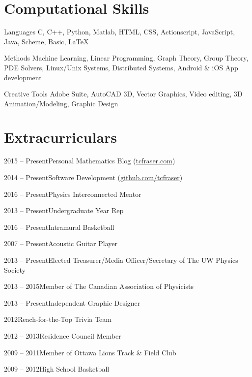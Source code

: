 \documentclass{article}
\begin{document}
    \section{Computational Skills}
    \begin{computerlist}
        \item{Languages}
             {C, C++, Python, Matlab, HTML, CSS, Actionscript, JavaScript, Java, Scheme, Basic, LaTeX}
        \item{Methods}
             {Machine Learning, Linear Programming, Graph Theory, Group Theory, PDE Solvers, Linux/Unix Systems, Distributed Systems, Android \& iOS App development}
        \item{Creative Tools}
             {Adobe Suite, AutoCAD 3D, Vector Graphics, Video editing, 3D Animation/Modeling, Graphic Design}
    \end{computerlist}
    \section{Extracurriculars}
    \begin{extralist}
        \item{2015 -- Present}{Personal Mathematics Blog (\href{http://tcfraser.com/}{tcfraser.com})}
        \item{2014 -- Present}{Software Development (\href{https://github.com/tcfraser}{github.com/tcfraser})}
        \item{2016 -- Present}{Physics Interconnected Mentor}
        \item{2013 -- Present}{Undergraduate Year Rep}
        \item{2016 -- Present}{Intramural Basketball}
        \item{2007 -- Present}{Acoustic Guitar Player}
        \item{2013 -- Present}{Elected Treasurer/Media Officer/Secretary of The UW Physics Society}
        \item{2013 -- 2015}{Member of The Canadian Association of Physicists}
        \item{2013 -- Present}{Independent Graphic Designer}
        \item{2012}{Reach-for-the-Top Trivia Team}
        \item{2012 -- 2013}{Residence Council Member}
        \item{2009 -- 2011}{Member of Ottawa Lions Track \& Field Club}
        \item{2009 -- 2012}{High School Basketball}
    \end{extralist}
    \latestrevisionfooter
\end{document}
